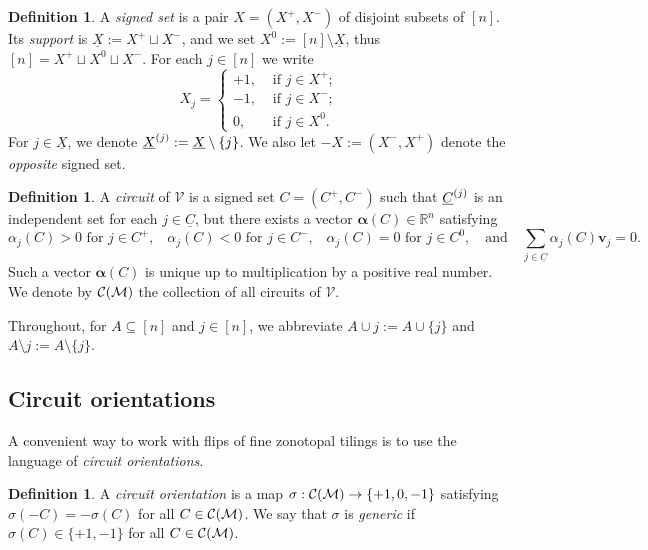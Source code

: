 \documentclass[11pt]{amsart}
\theoremstyle{plain}
\theoremstyle{definition}
\newtheorem{definition}[theorem]{Definition}
\def\R{\mathbb{R}}
\def\v{{\bm{v}}}
\def\V{\mathcal{V}}
\def\VC{\V}
\def\suppX{{\underline{X}}}
\def\suppC{{\underline{C}}}
\def\eltminus{\setminus}
\let\subset\subseteq
\begin{document}
\begin{definition}\label{def:signedsubset}
	A \emph{signed set} is a pair
	$X=(X^+, X^-)$ of disjoint subsets of $[n]$.  Its
	\emph{support} is $\suppX := X^+ \sqcup X^-$, and we set  $X^0:= [n] \setminus \underline{X}$, thus $[n]=X^+\sqcup X^0\sqcup X^-$.  For  each  
	$j\in [n]$ we write 
\begin{equation}\label{eq:signed_set}
	X_j = \begin{cases}
		 +1, &\text{ if }j \in X^+; \\
		 -1, &\text{ if }j \in X^-; \\
		0, &\text{ if } j \in X^0.
	\end{cases}
\end{equation}
For $j\in \suppX$, we denote $\setmin \suppX j:=\suppX\setminus\{j\}$. We also let $-X:=(X^-,X^+)$ denote the \emph{opposite} signed set.
\end{definition}

\def\alphaC{\bm{\alpha}(C)}
\def\alphaX(#1){\alpha(#1)}
\def\alphaCJ{\bm{\alpha}(C,J)}
\def\alphaXX(#1,#2){\bm{\alpha}(#1,#2)}
\def\alphaCx_#1{\alpha_{#1}(C)}
\def\alphaCJx_#1{\alpha_{#1}(C,J)}
\begin{definition}\label{dfn:alphaC}
A \emph{circuit}  of $\VC$ is a signed set $C=(C^+,C^-)$ such that  $\setmin \suppC j$ is an independent set for each $j\in\suppC$, but there exists a vector $\alphaC\in\R^n$ satisfying
\[\text{$\alphaCx_j>0$ for $j\in C^+$,}\quad \text{$\alphaCx_j<0$ for $j\in C^-$,}\quad \text{$\alphaCx_j=0$ for $j\in C^0$},\quad\text{and}\quad\text{$\sum_{j\in\suppC}\alphaCx_j \v_j=0$.}\]
Such a  vector $\alphaC$ is unique up to multiplication by a positive real number. We denote by $\mathcal{C}(\mathcal{M})$ the collection of all circuits of $\VC$.
\end{definition}


\def\Vert{\operatorname{Vert}}

Throughout, for $A\subset [n]$ and $j\in[n]$, we abbreviate $A\cup j:=A\cup\{j\}$ and $A\eltminus j:=A\setminus\{j\}$.
\subsection{Circuit orientations}\label{sec:circuit-orientations}
A convenient way to work with flips of fine zonotopal tilings is to use the language of \emph{circuit orientations}.
\begin{definition}
	A \emph{circuit orientation}  is a map $\sigma:\mathcal{C}(\mathcal{M})\to \{+1,0,-1\}$ satisfying $\sigma(-C)=-\sigma(C)$ for all $C\in\mathcal{C}(\mathcal{M})$. We say that $\sigma$ is \emph{generic} if $\sigma(C)\in\{+1,-1\}$ for all $C\in\mathcal{C}(\mathcal{M})$.
\end{definition}
\end{document}
